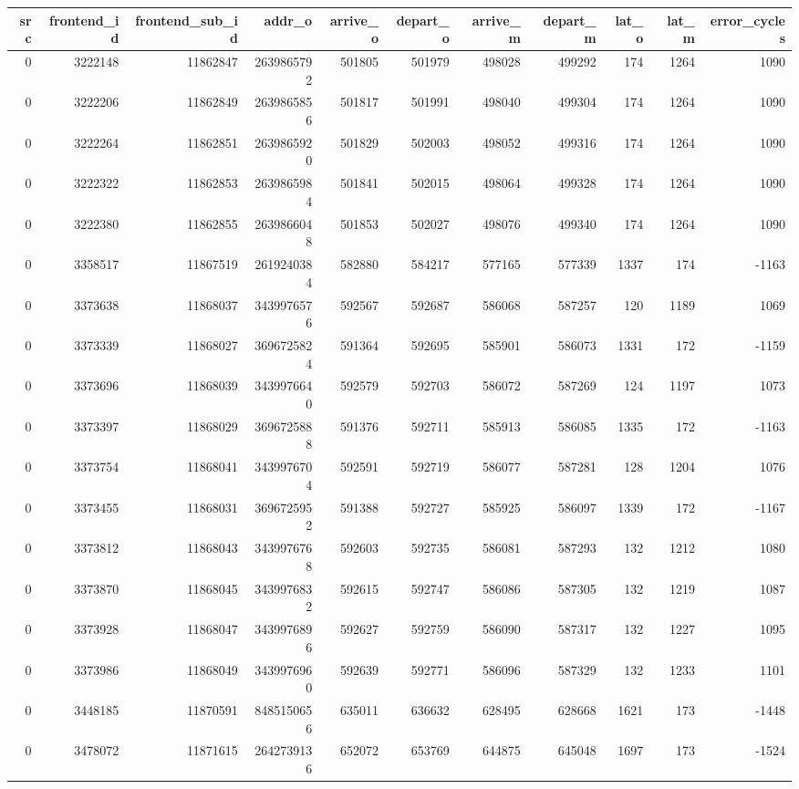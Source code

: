 \begin{tabular}{rrrrrrrrrrr}
\toprule
src & frontend\_id & frontend\_sub\_id & addr\_o & arrive\_o & depart\_o & arrive\_m & depart\_m & lat\_o & lat\_m & error\_cycles \\
\midrule
0 & 3222148 & 11862847 & 2639865792 & 501805 & 501979 & 498028 & 499292 & 174 & 1264 & 1090 \\
0 & 3222206 & 11862849 & 2639865856 & 501817 & 501991 & 498040 & 499304 & 174 & 1264 & 1090 \\
0 & 3222264 & 11862851 & 2639865920 & 501829 & 502003 & 498052 & 499316 & 174 & 1264 & 1090 \\
0 & 3222322 & 11862853 & 2639865984 & 501841 & 502015 & 498064 & 499328 & 174 & 1264 & 1090 \\
0 & 3222380 & 11862855 & 2639866048 & 501853 & 502027 & 498076 & 499340 & 174 & 1264 & 1090 \\
0 & 3358517 & 11867519 & 2619240384 & 582880 & 584217 & 577165 & 577339 & 1337 & 174 & -1163 \\
0 & 3373638 & 11868037 & 3439976576 & 592567 & 592687 & 586068 & 587257 & 120 & 1189 & 1069 \\
0 & 3373339 & 11868027 & 3696725824 & 591364 & 592695 & 585901 & 586073 & 1331 & 172 & -1159 \\
0 & 3373696 & 11868039 & 3439976640 & 592579 & 592703 & 586072 & 587269 & 124 & 1197 & 1073 \\
0 & 3373397 & 11868029 & 3696725888 & 591376 & 592711 & 585913 & 586085 & 1335 & 172 & -1163 \\
0 & 3373754 & 11868041 & 3439976704 & 592591 & 592719 & 586077 & 587281 & 128 & 1204 & 1076 \\
0 & 3373455 & 11868031 & 3696725952 & 591388 & 592727 & 585925 & 586097 & 1339 & 172 & -1167 \\
0 & 3373812 & 11868043 & 3439976768 & 592603 & 592735 & 586081 & 587293 & 132 & 1212 & 1080 \\
0 & 3373870 & 11868045 & 3439976832 & 592615 & 592747 & 586086 & 587305 & 132 & 1219 & 1087 \\
0 & 3373928 & 11868047 & 3439976896 & 592627 & 592759 & 586090 & 587317 & 132 & 1227 & 1095 \\
0 & 3373986 & 11868049 & 3439976960 & 592639 & 592771 & 586096 & 587329 & 132 & 1233 & 1101 \\
0 & 3448185 & 11870591 & 8485150656 & 635011 & 636632 & 628495 & 628668 & 1621 & 173 & -1448 \\
0 & 3478072 & 11871615 & 2642739136 & 652072 & 653769 & 644875 & 645048 & 1697 & 173 & -1524 \\

\end{tabular}
